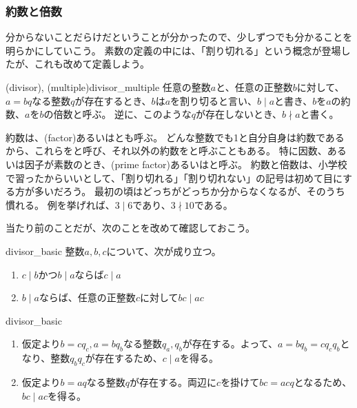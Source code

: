 \subsubsection{約数と倍数}
分からないことだらけだということが分かったので、少しずつでも分かることを明らかにしていこう。
素数の定義の中には、「割り切れる」という概念が登場したが、これも改めて定義しよう。

\begin{Defi}{(divisor), (multiple)}{divisor_multiple}
任意の整数$a$と、任意の正整数$b$に対して、$a=bq$なる整数$q$が存在するとき、$b$は$a$を割り切ると言い、$b \mid a$と書き、$b$を$a$の約数、$a$を$b$の倍数と呼ぶ。
逆に、このような$q$が存在しないとき、$b \nmid a$と書く。
\end{Defi}

約数は、(factor)あるいはとも呼ぶ。
どんな整数でも1と自分自身は約数であるから、これらをと呼び、それ以外の約数をと呼ぶこともある。
特に因数、あるいは因子が素数のとき、(prime factor)あるいはと呼ぶ。
約数と倍数は、小学校で習ったからいいとして、「割り切れる」「割り切れない」の記号は初めて目にする方が多いだろう。
最初の頃はどっちがどっちか分からなくなるが、そのうち慣れる。
例を挙げれば、$3 \mid 6$であり、$3 \nmid 10$である。

当たり前のことだが、次のことを改めて確認しておこう。

\begin{Prop}{}{divisor_basic}
整数$a,b,c$について、次が成り立つ。
\begin{enumerate}
 \item $c \mid b$かつ$b \mid a$ならば$c \mid a$
 \item $b \mid a$ならば、任意の正整数$c$に対して$bc \mid ac$
\end{enumerate}
\end{Prop}

\begin{prProof}{divisor_basic}\;
\begin{enumerate}
 \item 仮定より$b=cq_c, a=bq_b$なる整数$q_a,q_b$が存在する。よって、$a=bq_b=cq_cq_b$となり、整数$q_bq_c$が存在するため、$c \mid a$を得る。
 \item 仮定より$b=aq$なる整数$q$が存在する。両辺に$c$を掛けて$bc=acq$となるため、$bc \mid ac$を得る。
\end{enumerate}
\end{prProof}

